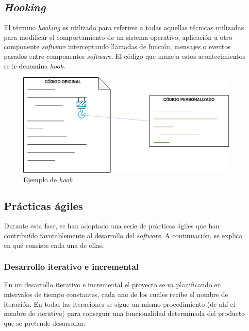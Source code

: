 \documentclass[
]{article}
\begin{document}
\hypertarget{hooking}{%
\subsection{\texorpdfstring{\emph{Hooking}}{Hooking}}\label{hooking}}

El término \emph{hooking} es utilizado para referirse a todas aquellas
técnicas utilizadas para modificar el comportamiento de un sistema
operativo, aplicación u otro componente \emph{software} interceptando
llamadas de función, mensajes o eventos pasados entre componentes
\emph{software}. El código que maneja estos acontecimientos se le
denomina \emph{hook}.

\begin{figure}
\hypertarget{hooks}{%
\centering
\includegraphics{../_static/images/hooks.png}
\caption{Ejemplo de \emph{hook}}\label{hooks}
}
\end{figure}

\hypertarget{pruxe1cticas-uxe1giles}{%
\subsection{Prácticas ágiles}\label{pruxe1cticas-uxe1giles}}

Durante esta fase, se han adoptado una serie de prácticas ágiles que han
contribuído favorablemente al desarrollo del \emph{software}. A
continuación, se explica en qué consiste cada una de ellas.

\hypertarget{desarrollo-iterativo-e-incremental}{%
\subsubsection{Desarrollo iterativo e
incremental}\label{desarrollo-iterativo-e-incremental}}

En un desarrollo iterativo e incremental el proyecto se va planificando
en intervalos de tiempo constantes, cada uno de los cuales recibe el
nombre de iteración. En todas las iteraciones se sigue un mismo
procedimiento (de ahí el nombre de iterativo) para conseguir una
funcionalidad determinada del producto que se pretende desarrollar.
\end{document}
